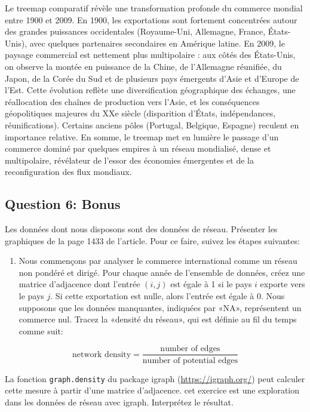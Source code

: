 \documentclass[
]{article}
\providecommand{\tightlist}{%
  \setlength{\itemsep}{0pt}\setlength{\parskip}{0pt}}
\begin{document}
Le treemap comparatif révèle une transformation profonde du commerce
mondial entre 1900 et 2009. En 1900, les exportations sont fortement
concentrées autour des grandes puissances occidentales (Royaume-Uni,
Allemagne, France, États-Unis), avec quelques partenaires secondaires en
Amérique latine. En 2009, le paysage commercial est nettement plus
multipolaire : aux côtés des États-Unis, on observe la montée en
puissance de la Chine, de l'Allemagne réunifiée, du Japon, de la Corée
du Sud et de plusieurs pays émergents d'Asie et d'Europe de l'Est. Cette
évolution reflète une diversification géographique des échanges, une
réallocation des chaînes de production vers l'Asie, et les conséquences
géopolitiques majeures du XXe siècle (disparition d'États,
indépendances, réunifications). Certains anciens pôles (Portugal,
Belgique, Espagne) reculent en importance relative. En somme, le treemap
met en lumière le passage d'un commerce dominé par quelques empires à un
réseau mondialisé, dense et multipolaire, révélateur de l'essor des
économies émergentes et de la reconfiguration des flux mondiaux.

\subsection{Question 6: Bonus}\label{question-6-bonus}

Les données dont nous disposons sont des données de réseau. Présenter
les graphiques de la page 1433 de l'article. Pour ce faire, suivez les
étapes suivantes:

\begin{enumerate}
\def\labelenumi{\arabic{enumi}.}
\tightlist
\item
  Nous commençons par analyser le commerce international comme un réseau
  non pondéré et dirigé. Pour chaque année de l'ensemble de données,
  créez une matrice d'adjacence dont l'entrée \((i,j)\) est égale à 1 si
  le pays \(i\) exporte vers le pays \(j\). Si cette exportation est
  nulle, alors l'entrée est égale à 0. Nous supposons que les données
  manquantes, indiquées par «NA», représentent un commerce nul. Tracez
  la «densité du réseau», qui est définie au fil du temps comme suit:
\end{enumerate}

\[
    \text{network density}  =  \frac{\text{number of edges}}{\text{number of potential edges}}
  \]

La fonction \texttt{graph.density} du package igraph
(\url{https://igraph.org/}) peut calculer cette mesure à partir d'une
matrice d'adjacence. cet exercice est une exploration dans les données
de réseau avec igraph. Interprétez le résultat.
\end{document}

